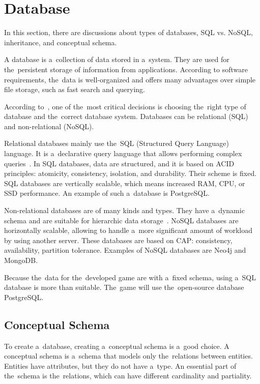 \section{Database}

In this section, there are discussions about types of databases, SQL vs. NoSQL, inheritance, and conceptual schema.

A database is a~collection of data stored in a~system.
They are used for the~persistent storage of information from applications.
According to software requirements, the~data is well-organized and offers many advantages over simple file storage, such as fast search and querying.

According to~\cite{a2018_difference_db}, one of the~most critical decisions is choosing the~right type of database and the~correct database system.
Databases can be relational (SQL) and non-relational (NoSQL).

Relational databases mainly use the~SQL (Structured Query Language) language.
It is a~declarative query language that allows performing complex queries~\cite{a2018_difference_db}.
In SQL databases, data are structured, and it is based on ACID principles: atomicity, consistency, isolation, and durability.
Their scheme is fixed.
SQL databases are vertically scalable, which means increased RAM, CPU, or SSD performance.
An example of such a~database is PostgreSQL.

Non-relational databases are of many kinds and types.
They have a~dynamic schema and are suitable for hierarchic data storage~\cite{a2018_difference_db}.
NoSQL databases are horizontally scalable, allowing to handle a~more significant amount of workload by using another server.
These databases are based on CAP: consistency, availability, partition tolerance.
Examples of NoSQL databases are Neo4j and MongoDB.

Because the~data for the~developed game are with a~fixed schema, using a~SQL database is more than suitable.
The~game will use the~open-source database PostgreSQL.

\subsection{Conceptual Schema}
\label{design:conceptual}

To create a~database, creating a~conceptual schema is a~good choice.
A conceptual schema is a~schema that models only the~relations between entities.
Entities have attributes, but they do not have a~type.
An essential part of the~schema is the~relations, which can have different cardinality and partiality.

